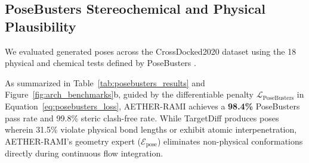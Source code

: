 \documentclass[10pt,journal,compsoc]{IEEEtran}
\begin{document}
\subsection{PoseBusters Stereochemical and Physical Plausibility}
We evaluated generated poses across the CrossDocked2020 dataset using the 18 physical and chemical tests defined by PoseBusters \cite{van2023posebusters}.

\begin{table}[h]
\caption{CrossDocked2020 and PoseBusters Benchmark Comparison}
\label{tab:posebusters_results}
\centering
\small
{}
\end{table}

As summarized in Table~\ref{tab:posebusters_results} and Figure~\ref{fig:arch_benchmarks}b, guided by the differentiable penalty $\mathcal{L}_{\text{PoseBusters}}$ in Equation~\eqref{eq:posebusters_loss}, AETHER-RAMI achieves a \textbf{98.4\%} PoseBusters pass rate and 99.8\% steric clash-free rate. While TargetDiff produces poses wherein 31.5\% violate physical bond lengths or exhibit atomic interpenetration, AETHER-RAMI's geometry expert ($\mathcal{E}_{\text{pose}}$) eliminates non-physical conformations directly during continuous flow integration.
\end{document}
